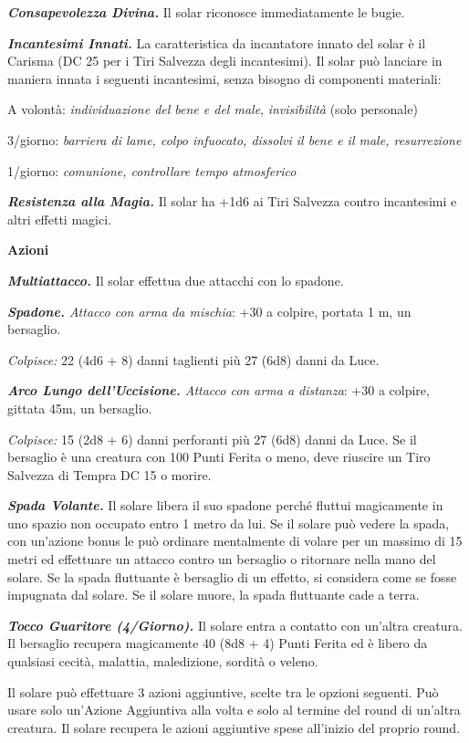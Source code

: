 \begin{multicols}{2}
\textit{\textbf{Consapevolezza Divina.}} Il solar riconosce immediatamente le bugie.

\textit{\textbf{Incantesimi Innati.}} La caratteristica da incantatore innato del solar è il Carisma (DC 25 per i Tiri Salvezza degli incantesimi). Il solar può lanciare in maniera innata i seguenti incantesimi, senza bisogno di componenti materiali:

A volontà: \textit{individuazione del bene e del male}, \textit{invisibilità} (solo personale)

3/giorno: \textit{barriera di lame, colpo infuocato, dissolvi il bene e il male, resurrezione}

1/giorno: \textit{comunione, controllare tempo atmosferico}

\textit{\textbf{Resistenza alla Magia.}} Il solar ha +1d6 ai Tiri Salvezza contro incantesimi e altri effetti magici.

\textbf{Azioni}

\textit{\textbf{Multiattacco.}} Il solar effettua due attacchi con lo spadone.

\textit{\textbf{Spadone.} Attacco con arma da mischia}: +30 a colpire, portata 1 m, un bersaglio.

\textit{Colpisce:} 22 (4d6 + 8) danni taglienti più 27 (6d8) danni da Luce.

\textit{\textbf{Arco Lungo dell'Uccisione.} Attacco con arma a distanza}: +30 a colpire, gittata 45m, un bersaglio.

\textit{Colpisce:} 15 (2d8 + 6) danni perforanti più 27 (6d8) danni da Luce. Se il bersaglio è una creatura con 100 Punti Ferita o meno, deve riuscire un Tiro Salvezza di Tempra DC 15 o morire.

\textit{\textbf{Spada Volante.}} Il solare libera il suo spadone perché fluttui magicamente in uno spazio non occupato entro 1 metro da lui. Se il solare può vedere la spada, con un'azione bonus le può ordinare mentalmente di volare per un massimo di 15 metri ed effettuare un attacco contro un bersaglio o ritornare nella mano del solare. Se la spada fluttuante è bersaglio di un effetto, si considera come se fosse impugnata dal solare. Se il solare muore, la spada fluttuante cade a terra.

\textit{\textbf{Tocco Guaritore (4/Giorno).}} Il solare entra a contatto con un'altra creatura. Il bersaglio recupera magicamente 40 (8d8 + 4) Punti Ferita ed è libero da qualsiasi cecità, malattia, maledizione, sordità o veleno.

Il solare può effettuare 3 azioni aggiuntive, scelte tra le opzioni seguenti. Può usare solo un'Azione Aggiuntiva alla volta e solo al termine del round di un'altra creatura. Il solare recupera le azioni aggiuntive spese all'inizio del proprio round.


\end{multicols}
